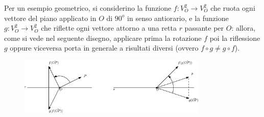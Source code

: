 \documentclass{book}
\begin{document}
Per un esempio geometrico, si considerino la funzione $f:V_O^2\to V_O^2$ che ruota ogni vettore
del piano applicato in $O$ di $90^o$ in senso antiorario, e la funzione $g:V_O^2\to V_O^2$ che
riflette ogni vettore attorno a una retta $r$ passante per $O$: allora, come si vede nel seguente
disegno, applicare prima la rotazione $f$ poi la riflessione $g$ oppure viceversa porta in
generale a risultati diversi (ovvero $f\circ g \neq g\circ f$).
\begin{figure}[ht]
  \centering
  \includegraphics[width=9cm]{img/finiti/imgex4-5-4.eps}
\end{figure}
\end{document}
